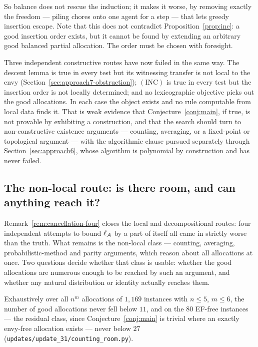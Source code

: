 So balance does not rescue the induction; it makes it worse, by removing exactly
the freedom --- piling chores onto one agent for a step --- that lets greedy
insertion escape. Note that this does not contradict
Proposition~\ref{prop:inc}: a good insertion order exists, but it cannot be found
by extending an arbitrary good balanced partial allocation. The order must be
chosen with foresight.

\begin{remark}
\label{rem:pattern}
Three independent constructive routes have now failed in the same way. The
descent lemma is true in every test but its witnessing transfer is not local to
the envy (Section~\ref{sec:approach7-obstruction}); $(\mathrm{INC})$ is true in
every test but the insertion order is not locally determined; and no
lexicographic objective picks out the good allocations. In each case the object
exists and no rule computable from local data finds it. That is weak evidence
that Conjecture~\ref{conj:main}, if true, is not provable by exhibiting a
construction, and that the search should turn to non-constructive existence
arguments --- counting, averaging, or a fixed-point or topological argument ---
with the algorithmic clause pursued separately through
Section~\ref{sec:approach6}, whose algorithm is polynomial by construction and
has never failed.
\end{remark}

\subsection{The non-local route: is there room, and can anything reach it?}
\label{sec:approach8-nonlocal}

Remark~\ref{rem:cancellation-four} closes the local and decompositional routes:
four independent attempts to bound $\ell_{\mathcal{A}}$ by a part of itself all came
in strictly worse than the truth. What remains is the non-local class --- counting,
averaging, probabilistic-method and parity arguments, which reason about all
allocations at once. Two questions decide whether that class is usable: whether
the good allocations are numerous enough to be reached by such an argument, and
whether any natural distribution or identity actually reaches them.

\begin{observation}
\label{obs:counting-room}
Exhaustively over all $n^m$ allocations of $1{,}169$ instances with $n \le 5$,
$m \le 6$, the number of good allocations never fell below $11$, and on the $80$
EF-free instances --- the residual class, since Conjecture~\ref{conj:main} is
trivial where an exactly envy-free allocation exists --- never below $27$
(\texttt{updates/update\_31/counting\_room.py}).
\end{observation}

